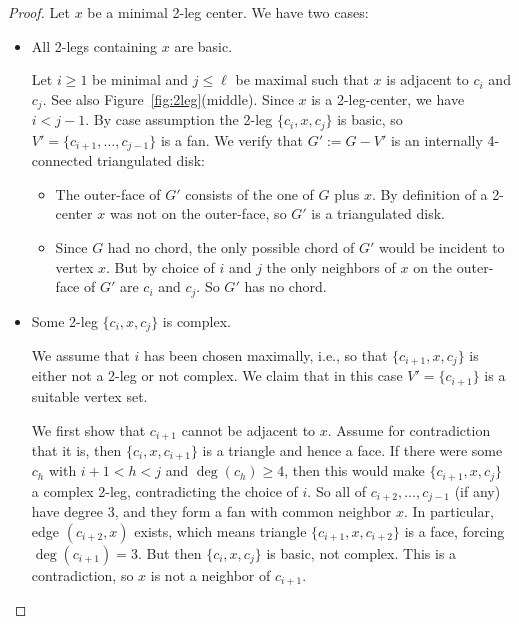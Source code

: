 \documentclass[12pt]{article}
\begin{document}
\begin{proof}
Let $x$ be a minimal 2-leg center.
We have two cases:
\begin{itemize}
\item All 2-legs containing  $x$ are basic.

Let $i\geq 1$ be minimal and $j\leq \ell$ be maximal such that $x$ is adjacent
to $c_i$ and $c_j$.  
See also Figure~\ref{fig:2leg}(middle).
Since $x$ is a 2-leg-center, we have $i<j-1$.
By case assumption the 2-leg $\{c_i,x,c_j\}$ is basic, so 
$V'=\{c_{i+1},\dots,c_{j-1}\}$ is a fan. 
We verify that $G':=G-V'$ is an internally 4-connected triangulated disk:
\begin{itemize}
\item The outer-face of $G'$ consists of the one of $G$ plus $x$.
	By definition of a 2-center $x$ was not on the outer-face, so
	$G'$ is a triangulated disk.
\item Since $G$ had no chord, the only possible chord of $G'$ would be
	incident to vertex $x$.  But by choice of $i$ and $j$ the only
	neighbors of $x$ on the outer-face of $G'$ are $c_i$ and $c_j$.  So
	$G'$ has no chord.
\end{itemize}


\item Some 2-leg $\{c_i,x,c_j\}$ is complex.

We assume that $i$ has been chosen maximally, i.e., so 
that $\{c_{i+1},x,c_j\}$ is
either not a 2-leg or not complex.
We claim that in this case $V'=\{c_{i+1}\}$ is a suitable vertex set.

We first show that $c_{i+1}$ cannot be adjacent
to $x$.  Assume for contradiction that it is, then $\{c_i,x,c_{i+1}\}$ is
a triangle and hence a face.  If there were some $c_h$
with $i+1<h<j$ and $\deg(c_h)\geq 4$, then this would make
$\{c_{i+1},x,c_j\}$ a complex 2-leg, contradicting the choice of $i$.
So all of $c_{i+2},\dots,c_{j-1}$ (if any) have degree 3, and they
form a fan with common neighbor $x$.    In particular, edge $(c_{i+2},x)$
exists, which means triangle $\{c_{i+1},x,c_{i+2}\}$ is a face, forcing
$\deg(c_{i+1})=3$.  But then $\{c_i,x,c_j\}$ is basic, not complex.
This is a contradiction, so $x$ is not a neighbor of $c_{i+1}$.


\end{itemize}
\end{proof}
\end{document}
